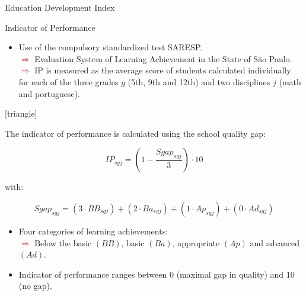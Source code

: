\documentclass{beamer}
\begin{document}
\begin{frame}[label=IndPerf]{Education Development Index}
\vspace{-28pt} \flushright \hyperlink{Main1}{\beamerbutton{\textcolor{red}{Back}}}
\vspace{10pt}
\begin{block}{\centering Indicator of Performance}
\begin{itemize}
\item [\sbt] \scriptsize Use of the compulsory standardized test SARESP. 
\\ \tiny\textcolor{red}{$\Longrightarrow$} Evaluation System of Learning Achievement in the State of São Paulo.
\\ \tiny\textcolor{red}{$\Longrightarrow$} IP is measured as the average score of students calculated individually for each of the three grades $g$ (5th, 9th and 12th) and two disciplines $j$ (math and portuguese).
\end{itemize}

\vspace{-5pt}
[triangle]
\begin{itemize} 
{\scriptsize\item The indicator of performance is calculated using the school quality gap: }
\end{itemize}

\vspace{-8pt}
\begin{equation} \label{eq:IndPerformance}
IP_{sgj} = \left(1 - \frac{Sgap_{sgj}}{3}\right) \cdot 10
\end{equation}

\vspace{-8pt}
{\scriptsize with:}

\vspace{-25pt}
\begin{equation} \label{eq:Sgap}
Sgap_{sgj} = (3 \cdot BB_{sgj}) + (2 \cdot Ba_{sgj}) + (1 \cdot Ap_{sgj}) + (0 \cdot Ad_{sgj})
\end{equation}

\vspace{-10pt}
\begin{itemize}
\item [\sbt] \scriptsize Four categories of learning achievements: 
\\ \tiny\textcolor{red}{$\Longrightarrow$} Below the basic $(BB)$, basic $(Ba)$, appropriate $(Ap)$ and advanced $(Ad)$.
\item [\sbt] \scriptsize Indicator of performance ranges between 0 (maximal gap in quality) and 10 (no gap).
\end{itemize}
\end{block}


\end{frame}
\end{document}
